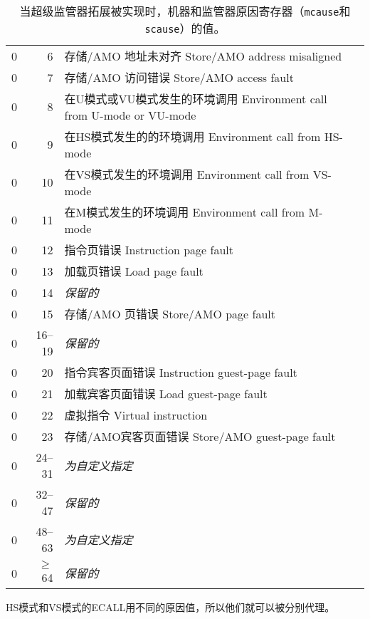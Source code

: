 \begin{table*}[p]
\begin{center}
\begin{tabular}{|r|r|l|l|}
  0         & 6               & 存储/AMO 地址未对齐  Store/AMO address misaligned \\
  0         & 7               & 存储/AMO 访问错误  Store/AMO access fault \\
  0         & 8               & 在U模式或VU模式发生的环境调用  Environment call from U-mode or VU-mode \\
  0         & 9               & 在HS模式发生的的环境调用  Environment call from HS-mode \\
  0         & 10              & 在VS模式发生的环境调用 Environment call from VS-mode \\
  0         & 11              & 在M模式发生的环境调用  Environment call from M-mode \\
  0         & 12              & 指令页错误  Instruction page fault \\
  0         & 13              & 加载页错误 Load page fault \\
  0         & 14              & {\em 保留的} \\
  0         & 15              & 存储/AMO 页错误  Store/AMO page fault \\
  0         & 16--19          & {\em 保留的} \\
  0         & 20              & 指令宾客页面错误  Instruction guest-page fault \\
  0         & 21              & 加载宾客页面错误  Load guest-page fault \\
  0         & 22              & 虚拟指令 Virtual instruction \\
  0         & 23              & 存储/AMO宾客页面错误  Store/AMO guest-page fault \\
  0         & 24--31          & {\em 为自定义指定} \\
  0         & 32--47          & {\em 保留的} \\
  0         & 48--63          & {\em 为自定义指定} \\
  0         & $\ge$64         & {\em 保留的} \\
  \hline
\end{tabular}
\end{center}
\caption{当超级监管器拓展被实现时，机器和监管器原因寄存器（{\tt mcause}和{\tt scause}）的值。
}
\label{hcauses}
\end{table*}

\begin{commentary}
  HS模式和VS模式的ECALL用不同的原因值，所以他们就可以被分别代理。
\end{commentary}

